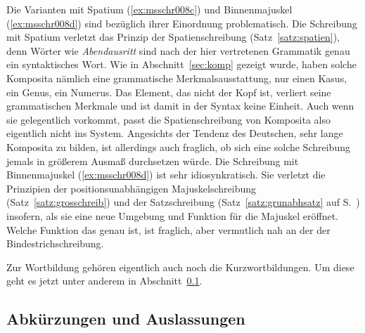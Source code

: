 Die Varianten mit Spatium (\ref{ex:msschr008c}) und Binnenmajuskel (\ref{ex:msschr008d}) sind bezüglich ihrer Einordnung problematisch.
Die Schreibung mit Spatium verletzt das Prinzip der Spatienschreibung (Satz~\ref{satz:spatien}), denn Wörter wie \textit{Abendausritt} sind nach der hier vertretenen Grammatik genau ein syntaktisches Wort.
Wie in Abschnitt~\ref{sec:komp} gezeigt wurde, haben solche Komposita nämlich eine grammatische Merkmalsausstattung, \zB nur einen Kasus, ein Genus, ein Numerus.
Das Element, das nicht der Kopf ist, verliert seine grammatischen Merkmale und ist damit in der Syntax keine Einheit.
Auch wenn sie gelegentlich vorkommt, passt die Spatienschreibung von Komposita also eigentlich nicht ins System.
Angesichts der Tendenz des Deutschen, sehr lange Komposita zu bilden, ist allerdings auch fraglich, ob sich eine solche Schreibung jemals in größerem Ausmaß durchsetzen würde.
Die Schreibung mit Binnenmajuskel (\ref{ex:msschr008d}) ist sehr idiosynkratisch.
Sie verletzt die Prinzipien der positionsunabhängigen Majuskelschreibung (Satz~\ref{satz:grosschreib}) und der Satzschreibung (Satz~\ref{satz:grunabhsatz} auf S.~\pageref{satz:grunabhsatz}) insofern, als sie eine neue Umgebung und Funktion für die Majuskel eröffnet.
Welche Funktion das genau ist, ist fraglich, aber vermutlich nah an der der Bindestrichschreibung.

Zur Wortbildung gehören eigentlich auch noch die Kurzwortbildungen.
Um diese geht es jetzt unter anderem in Abschnitt~\ref{sec:abkuerz}.

\subsection{Abkürzungen und Auslassungen}

\label{sec:abkuerz}

